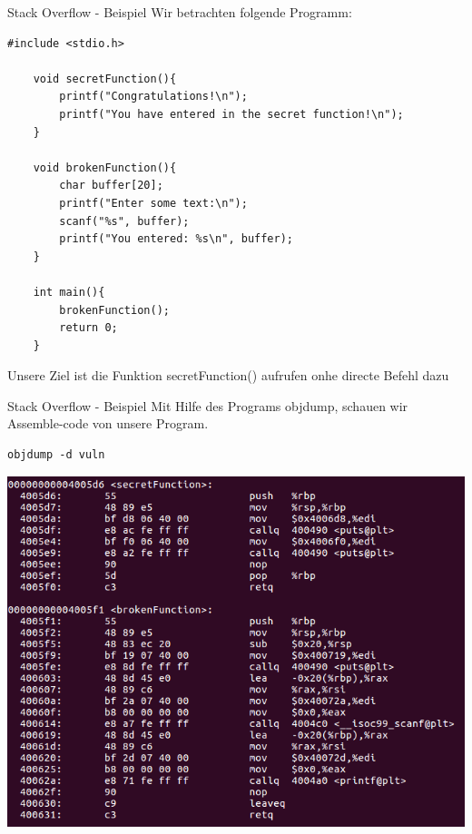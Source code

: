 \documentclass[10pt]{beamer}
\begin{document}
\begin{frame}[fragile]{Stack Overflow - Beispiel}
  Wir betrachten folgende Programm:
  \begin{lstlisting}[style=C2Style]
    #include <stdio.h>

    void secretFunction(){
        printf("Congratulations!\n");
        printf("You have entered in the secret function!\n");
    }

    void brokenFunction(){
        char buffer[20];
        printf("Enter some text:\n");
        scanf("%s", buffer);
        printf("You entered: %s\n", buffer);    
    }

    int main(){
        brokenFunction();
        return 0;
    }

  \end{lstlisting}
  Unsere Ziel ist die Funktion secretFunction() aufrufen onhe directe Befehl dazu
\end{frame}

\begin{frame}[fragile]{Stack Overflow - Beispiel}
  Mit Hilfe des Programs objdump, schauen wir Assemble-code von unsere Program.

  \begin{lstlisting}[style=C2Style]
    objdump -d vuln
  \end{lstlisting}

  \includegraphics[width=\textwidth]{buffer-1.png}
\end{frame}
\end{document}
